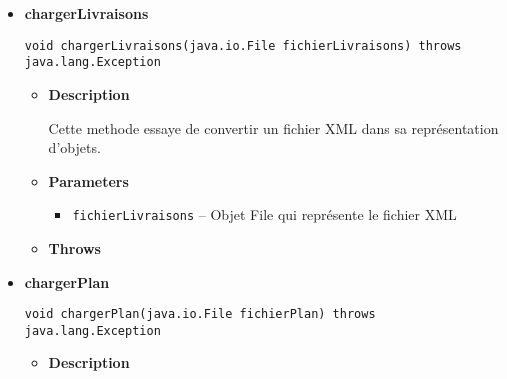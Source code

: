 \documentclass[11pt,a4paper]{report}
\begin{document}
{{{{\begin{itemize}
{\begin{itemize}
{Ajoute un observateur à la tournée
}
\item{
{\bf  Parameters}
  \begin{itemize}
   \item{
\texttt{tourneeObserveur} -- }
  \end{itemize}
}%
\end{itemize}
}%
\item{ 
\hypertarget{controleur.ControleurInterface.chargerLivraisons(java.io.File)}{{\bf  chargerLivraisons}\\}
\begin{lstlisting}[frame=none]
void chargerLivraisons(java.io.File fichierLivraisons) throws java.lang.Exception\end{lstlisting} %
\begin{itemize}
\item{
{\bf  Description}

Cette methode essaye de convertir un fichier XML dans sa représentation d'objets.
}
\item{
{\bf  Parameters}
  \begin{itemize}
   \item{
\texttt{fichierLivraisons} -- Objet File qui représente le fichier XML}
  \end{itemize}
}%
\item{{\bf  Throws}
}%
\end{itemize}
}%
\item{ 
\hypertarget{controleur.ControleurInterface.chargerPlan(java.io.File)}{{\bf  chargerPlan}\\}
\begin{lstlisting}[frame=none]
void chargerPlan(java.io.File fichierPlan) throws java.lang.Exception\end{lstlisting} %
\begin{itemize}
\item{
{\bf  Description}

}
\end{itemize}}
\end{itemize}}}}}
\end{document}
